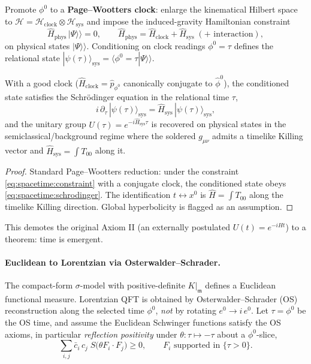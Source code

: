 Promote $\phi^0$ to a \textbf{Page--Wootters clock}: enlarge the kinematical Hilbert
space to $\mathcal H=\mathcal H_{\mathrm{clock}}\otimes\mathcal H_{\mathrm{sys}}$ and
impose the induced-gravity Hamiltonian constraint
\begin{equation}\label{eq:spacetime:constraint}
  \widehat H_{\mathrm{phys}}\,|\Psi\rangle\!\rangle=0,\qquad
  \widehat H_{\mathrm{phys}}=\widehat H_{\mathrm{clock}}+\widehat H_{\mathrm{sys}}
  \;(+\text{ interaction}),
\end{equation}
on physical states $|\Psi\rangle\!\rangle$. Conditioning on clock readings $\phi^0=\tau$
defines the relational state $|\psi(\tau)\rangle_{\mathrm{sys}}=\langle\phi^0{=}\tau|\Psi\rangle\!\rangle$.

\begin{theorem}\label{thm:spacetime:PW}
With a good clock ($\widehat H_{\mathrm{clock}}=\widehat p_{\phi^0}$ canonically
conjugate to $\widehat\phi^0$), the conditioned state satisfies the Schr\"odinger
equation in the relational time $\tau$,
\begin{equation}\label{eq:spacetime:schrodinger}
  i\,\partial_\tau\,|\psi(\tau)\rangle_{\mathrm{sys}}
  =\widehat H_{\mathrm{sys}}\,|\psi(\tau)\rangle_{\mathrm{sys}},
\end{equation}
and the unitary group $U(\tau)=e^{-i\widehat H_{\mathrm{sys}}\tau}$ is recovered on
physical states in the semiclassical/background regime where the soldered $g_{\mu\nu}$
admits a timelike Killing vector and $\widehat H_{\mathrm{sys}}=\int T_{00}$ along it.
\end{theorem}
\begin{proof}
Standard Page--Wootters reduction: under the constraint
\eqref{eq:spacetime:constraint} with a conjugate clock, the conditioned state obeys
\eqref{eq:spacetime:schrodinger}. The identification $t\leftrightarrow x^0$ is
$\widehat H=\int T_{00}$ along the timelike Killing direction. Global hyperbolicity is
flagged as an assumption.
\end{proof}

This demotes the original Axiom II (an externally postulated $U(t)=e^{-iHt}$) to a
theorem: time is emergent.

\paragraph{Euclidean to Lorentzian via Osterwalder--Schrader.}
The compact-form $\sigma$-model with positive-definite $K|_{\mathfrak m}$ defines a
Euclidean functional measure. Lorentzian QFT is obtained by Osterwalder--Schrader (OS)
reconstruction along the selected time $\phi^0$, \emph{not} by rotating
$e^0\to i\,e^0$. Let $\tau=\phi^0$ be the OS time, and assume the Euclidean Schwinger
functions satisfy the OS axioms, in particular \emph{reflection positivity} under
$\theta:\tau\mapsto-\tau$ about a $\phi^0$-slice,
\begin{equation}\label{eq:spacetime:reflpos}
  \sum_{i,j}\bar c_i\,c_j\;S\bigl(\theta F_i\cdot F_j\bigr)\ge0,
  \qquad F_i \text{ supported in }\{\tau>0\}.
\end{equation}


